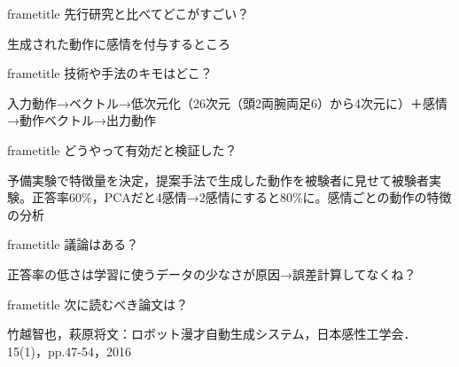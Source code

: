 \begin{frame}[plain,t]
\begin{multicols}{2}
    \vfill
    \begin{beamercolorbox}[rounded=true, center, shadow=true,wd=\linewidth]{frametitle}
      先行研究と比べてどこがすごい？
    \end{beamercolorbox}
    生成された動作に感情を付与するところ

    \vfill
    \begin{beamercolorbox}[rounded=true, center, shadow=true,wd=\linewidth]{frametitle}
      技術や手法のキモはどこ？
    \end{beamercolorbox}
    入力動作→ベクトル→低次元化（26次元（頭2両腕両足6）から4次元に）＋感情→動作ベクトル→出力動作

    \newpage
    \begin{beamercolorbox}[rounded=true, center, shadow=true,wd=\linewidth]{frametitle}
      どうやって有効だと検証した？
    \end{beamercolorbox}
    予備実験で特徴量を決定，提案手法で生成した動作を被験者に見せて被験者実験。正答率60\%，PCAだと4感情→2感情にすると80\%に。感情ごとの動作の特徴の分析

    \vfill
    \begin{beamercolorbox}[rounded=true, center, shadow=true,wd=\linewidth]{frametitle}
      議論はある？
    \end{beamercolorbox}
    正答率の低さは学習に使うデータの少なさが原因→誤差計算してなくね？

    \vfill
    \begin{beamercolorbox}[rounded=true, center, shadow=true,wd=\linewidth]{frametitle}
      次に読むべき論文は？
    \end{beamercolorbox}
    竹越智也，萩原将文：ロボット漫才自動生成システム，日本感性工学会．15(1)，pp.47-54，2016


  \end{multicols}
\end{frame}
